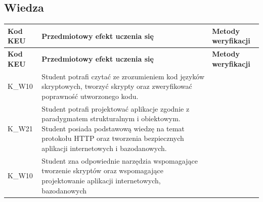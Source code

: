 \documentclass[12pt, a4paper]{article}
\newcommand{\thdrule}{\noalign{\global\setlength{\extrarowheight}{0pt}}}
\newcommand{\thdend}{\noalign{\global\setlength{\extrarowheight}{3pt}}}
\begin{document}
\subsection*{Wiedza}
{\scriptsize
\begin{longtable}{m{1.6cm}m{9.0cm}m{4.2cm}}
\thdrule\toprule
\rowcolor{pjatkRed} {\color{white}\footnotesize\textbf{\vphantom{Ag}Kod KEU}} & {\color{white}\footnotesize\textbf{\vphantom{Ag}Przedmiotowy efekt uczenia się}} & {\color{white}\footnotesize\textbf{\vphantom{Ag}Metody weryfikacji}} \\
\midrule\thdend
\endfirsthead
\thdrule\toprule
\rowcolor{pjatkRed} {\color{white}\footnotesize\textbf{\vphantom{Ag}Kod KEU}} & {\color{white}\footnotesize\textbf{\vphantom{Ag}Przedmiotowy efekt uczenia się}} & {\color{white}\footnotesize\textbf{\vphantom{Ag}Metody weryfikacji}} \\
\midrule\thdend
\endhead
  \rowcolor{tableRowLight} K\_W10 & Student potrafi  czytać ze zrozumieniem kod języków skryptowych,  tworzyć skrypty  oraz zweryfikować poprawność utworzonego kodu. &  \\
  \rowcolor{tableRowAlt} K\_W21 & Student potrafi projektować aplikacje  zgodnie z paradygmatem strukturalnym i obiektowym. Student posiada podstawową wiedzę na temat protokołu HTTP oraz tworzenia bezpiecznych aplikacji internetowych i bazodanowych. &  \\
  \rowcolor{tableRowLight} K\_W10 & Student zna odpowiednie narzędzia wspomagające tworzenie skryptów oraz wspomagające projektowanie aplikacji internetowych, bazodanowych &  \\
\bottomrule
\end{longtable}}
\end{document}
